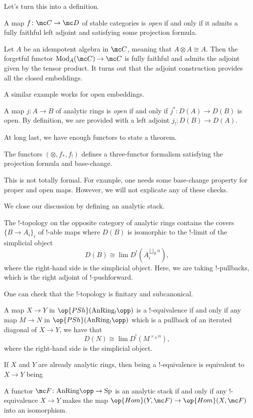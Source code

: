 \documentclass{article}
\begin{document}
Let's turn this into a definition.
\begin{definition}
	A map $f\colon\mc C\to\mc D$ of stable categories is \textit{open} if and only if it admits a fully faithful left adjoint and satisfying some projection formula.
\end{definition}
\begin{example}
	Let $A$ be an idempotent algebra in $\mc C$, meaning that $A\otimes A\cong A$. Then the forgetful functor $\mathrm{Mod}_A(\mc C)\to\mc C$ is fully faithful and admits the adjoint given by the tensor product. It turns out that the adjoint construction provides all the closed embeddings.
\end{example}
A similar example works for open embeddings.
\begin{definition}
	A map $j\colon A\to B$ of analytic rings is \textit{open} if and only if $j^*\colon D(A)\to D(B)$ is open. By definition, we are provided with a left adjoint $j_!\colon D(B)\to D(A)$.
\end{definition}
At long last, we have enough functors to state a theorem.
\begin{theorem}
	The functors $(\otimes,f_*,f_!)$ defines a three-functor formalism satisfying the projection formula and base-change.
\end{theorem}
This is not totally formal. For example, one needs some base-change property for proper and open maps. However, we will not explicate any of these checks.

We close our discussion by defining an analytic stack.
\begin{definition}
	The $!$-topology on the opposite category of analytic rings contains the covers $\{B\to A_i\}_i$ of $!$-able maps where $D(B)$ is isomorphic to the $!$-limit of the simplicial object
	\[D(B)\cong\lim D^!(A_i^{\bigsqcup_B n}),\]
	where the right-hand side is the simplicial object. Here, we are taking $!$-pullbacks, which is the right adjoint of $!$-pushforward.
\end{definition}
\begin{remark}
	One can check that the $!$-topology is finitary and subcanonical.
\end{remark}
\begin{definition}
	A map $X\to Y$ in $\op{PSh}(\mathrm{AnRing}_!\opp)$ is a $!$-equivalence if and only if any map $M\to N$ in $\op{PSh}(\mathrm{AnRing}_!\opp)$ which is a pullback of an iterated diagonal of $X\to Y$, we have that
	\[D(N)\cong\lim D^!(M^{\times_N n}),\]
	where the right-hand side is the simplicial object.
\end{definition}
\begin{example}
	If $X$ and $Y$ are already analytic rings, then being a $!$-equivalence is equivalent to $X\to Y$ being 
\end{example}
\begin{definition}
	A functor $\mc F\colon\mathrm{AnRing}\opp\to\mathrm{Sp}$ is an analytic stack if and only if any $!$-equivalence $X\to Y$ makes the map $\op{Hom}(Y,\mc F)\to\op{Hom}(X,\mc F)$ into an isomorphism.
\end{definition}
\end{document}
